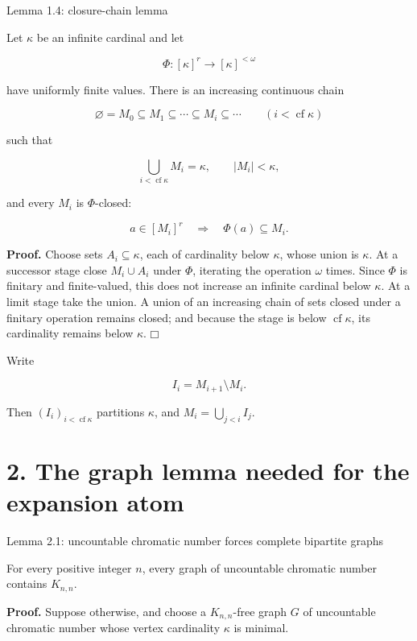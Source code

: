 \documentclass[11pt]{article}
\providecommand{\square}{\mdlgwhtsquare}
\begin{document}
\label{lemma-1.4-closure-chain-lemma}
\begin{lemmabox}{Lemma 1.4: closure-chain lemma}

Let \(\kappa\) be an infinite cardinal and let

\[
\Phi:[\kappa]^r\longrightarrow[\kappa]^{<\omega}
\]

have uniformly finite values. There is an increasing continuous chain

\[
\varnothing=M_0\subseteq M_1\subseteq\cdots
\subseteq M_i\subseteq\cdots\qquad(i<\operatorname{cf}\kappa)
\]

such that

\[
\bigcup_{i<\operatorname{cf}\kappa}M_i=\kappa,
\qquad |M_i|<\kappa,
\]

and every \(M_i\) is \(\Phi\)-closed:

\[
a\in[M_i]^r\quad\Longrightarrow\quad\Phi(a)\subseteq M_i.
\]

\end{lemmabox}
\textbf{Proof.} Choose sets \(A_i\subseteq\kappa\), each of cardinality below \(\kappa\), whose union is \(\kappa\). At a successor stage close \(M_i\cup A_i\) under \(\Phi\), iterating the operation \(\omega\) times. Since \(\Phi\) is finitary and finite-valued, this does not increase an infinite cardinal below \(\kappa\). At a limit stage take the union. A union of an increasing chain of sets closed under a finitary operation remains closed; and because the stage is below \(\operatorname{cf}\kappa\), its cardinality remains below \(\kappa\). \(\square\)

Write

\[
I_i=M_{i+1}\setminus M_i.
\]

Then \((I_i)_{i<\operatorname{cf}\kappa}\) partitions \(\kappa\), and \(M_i=\bigcup_{j<i}I_j\).

\section{2. The graph lemma needed for the expansion atom}\label{the-graph-lemma-needed-for-the-expansion-atom}

\label{lemma-2.1-uncountable-chromatic-number-forces-complete-bipartite-graphs}
\begin{lemmabox}{Lemma 2.1: uncountable chromatic number forces complete bipartite graphs}

For every positive integer \(n\), every graph of uncountable chromatic number contains \(K_{n,n}\).

\end{lemmabox}
\textbf{Proof.} Suppose otherwise, and choose a \(K_{n,n}\)-free graph \(G\) of uncountable chromatic number whose vertex cardinality \(\kappa\) is minimal.
\end{document}
